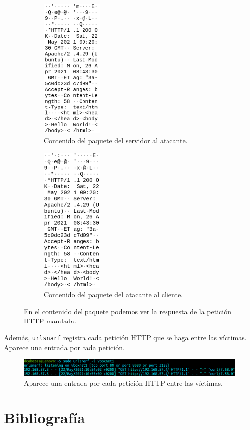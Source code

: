 \documentclass[11pt]{article}
\begin{document}
\begin{figure}[H]
	\centering
	\begin{subfigure}{0.45\textwidth}
		\centering
		\includegraphics[width=30mm]{images/atack1/server-atacker}
		\captionsetup{width=0.5\linewidth}
		\caption{Contenido del paquete del servidor al atacante.}
	\end{subfigure}
	\hspace{-20mm}
	\begin{subfigure}{0.45\textwidth}
		\centering
		\includegraphics[width=30mm]{images/atack1/atacker-client}
		\captionsetup{width=0.5\linewidth}
		\caption{Contenido del paquete del atacante al cliente.}
	\end{subfigure}
	\caption{En el contenido del paquete podemos ver la respuesta de la petición HTTP mandada.}
\end{figure}

Además, \texttt{urlsnarf} registra cada petición HTTP que se haga entre las víctimas. Aparece una entrada por cada petición.

\begin{figure}[H]
	\centering
	\includegraphics[width=160mm]{images/atack1/urlsnarf}
	\caption{Aparece una entrada por cada petición HTTP entre las víctimas.}
	\label{fig:urlsnarf}
\end{figure}

\section{Bibliografía}

\end{document}
